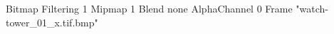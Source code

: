 {Bitmap
	{Filtering 1}
	{Mipmap 1}
	{Blend none}
	{AlphaChannel 0}
	{Frame "watch-tower_01_x.tif.bmp"}
}
